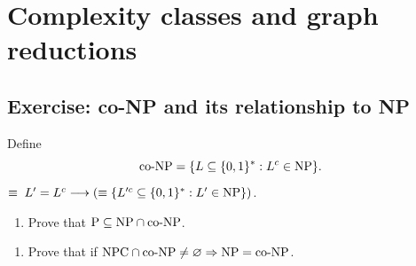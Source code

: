 \section{Complexity classes and graph reductions}
\subsection{Exercise: co-NP and its relationship to NP}
Define
\[\mathrm{co\text{-}NP}=\{L\subseteq\{0,1\}^*:L^c\in\mathrm{NP}\}.\]
$\equiv\;L'=L^c\longrightarrow(\equiv\{L'^c\subseteq\{0,1\}^*:L'\in\mathrm{NP}\})$.
\begin{enumerate}
\item Prove that $\mathrm{P}\subseteq\mathrm{NP}\cap\mathrm{co\text{-}NP}$.
\end{enumerate}
\begin{enumerate}[start=2]
\item Prove that if $\mathrm{NPC}\cap\mathrm{co\text{-}NP}\ne\varnothing\Rightarrow\mathrm{NP}=\mathrm{co\text{-}NP}$.
\end{enumerate}
